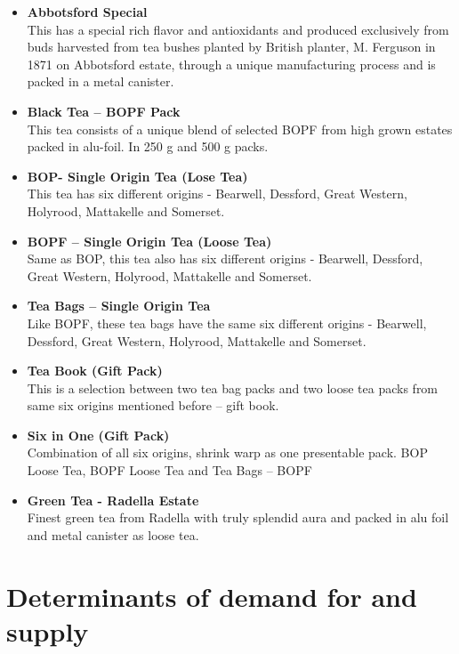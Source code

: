 \documentclass[12pt]{report}
\begin{document}
\begin{itemize}
	\item {\bf{Abbotsford Special}} \\
	      This has a special rich flavor and antioxidants and produced exclusively from buds harvested from tea bushes planted by British planter, M. Ferguson in 1871 on Abbotsford estate, through a unique manufacturing process and is packed in a metal canister.

	\item {\bf{Black Tea – BOPF Pack}} \\
	      This tea consists of a unique blend of selected BOPF from high grown estates packed in alu-foil. In 250 g and 500 g packs.

	\item {\bf{BOP- Single Origin Tea (Lose Tea)}} \\
	      This tea has six different origins - Bearwell, Dessford, Great Western, Holyrood, Mattakelle and Somerset.

	\item {\bf{BOPF – Single Origin Tea (Loose Tea)}} \\
	      Same as BOP, this tea also has six different origins - Bearwell, Dessford, Great Western, Holyrood, Mattakelle and Somerset.

	\item {\bf{Tea Bags – Single Origin Tea}} \\
	      Like BOPF, these tea bags have the same six different origins - Bearwell, Dessford, Great Western, Holyrood, Mattakelle and Somerset.

	\item {\bf{Tea Book (Gift Pack) }} \\
	      This is a selection between two tea bag packs and two loose tea packs from same six origins mentioned before – gift book.

	\item {\bf{Six in One (Gift Pack) }} \\
	      Combination of all six origins, shrink warp as one presentable pack. BOP Loose Tea, BOPF Loose Tea and Tea Bags – BOPF

	\item {\bf{Green Tea - Radella Estate}} \\
	      Finest green tea from Radella with truly splendid aura and packed in alu foil and metal canister as loose tea.
\end{itemize}

\chapter{Determinants of demand for and supply}
\end{document}

